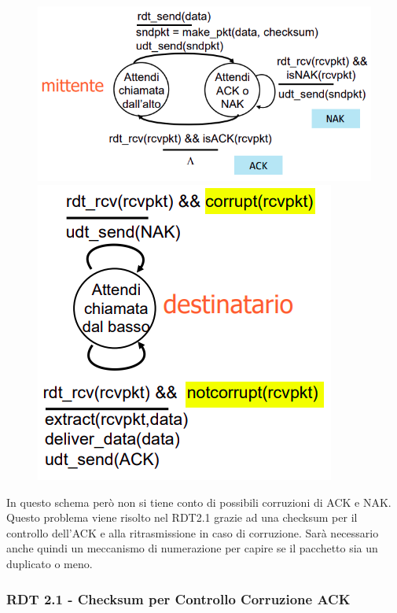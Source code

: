 \documentclass{article}
\begin{document}
\begin{figure}[htbp]
    \center
    \includegraphics[scale=0.45]{img/RDT2.0_mittente.png}
    \hspace*{30px}
    \includegraphics[scale=0.45]{img/RDT2.0_destinatario.png}
\end{figure}

In questo schema però non si tiene conto di possibili corruzioni di ACK e NAK. Questo problema viene risolto nel
RDT2.1 grazie ad una checksum per il controllo dell'ACK e alla ritrasmissione in caso di corruzione.
Sarà necessario anche quindi un meccanismo di numerazione per capire se il pacchetto sia un duplicato o meno.

\newpage

\subsubsection{RDT 2.1 - Checksum per Controllo Corruzione ACK}
\end{document}
